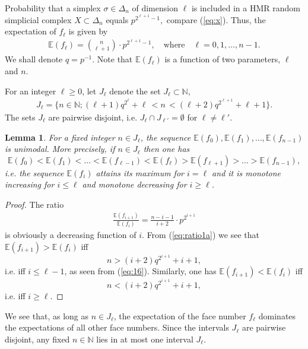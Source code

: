 \documentclass[11pt,twoside, reqno]{amsart}
\theoremstyle{plain}
\newtheorem{lema}{Lemma}
\newtheorem{corollary}[lema]{Corollary}
\theoremstyle{definition}
\newcommand{\N}{\mathbb{N}}
\newcommand{\E}{\mathbb{E}}
\begin{document}
Probability that a simplex $\sigma\in \Delta_n$ of dimension $\ell$ is included in a HMR random simplicial complex $X\subset \Delta_n$ equals 
$
p^{2^{\ell+1}-1},
$
compare (\ref{eq:x}). Thus, the expectation of $f_\ell$ is given by 
\begin{eqnarray}\label{eq:expect}
\mathbb E(f_\ell) =\binom n {\ell+1} \cdot p^{2^{\ell+1}-1}, \quad \mbox{where}\quad \ell=0, 1, \dots, n-1.
\end{eqnarray}
We shall denote $q=p^{-1}.$ Note that $\E(f_\ell)$ is a function of two parameters, $\ell$ and $n$. 

For an integer $\ell\ge 0$, let $J_\ell$ denote the set $J_\ell\subset \N$,
\begin{eqnarray}\label{eq:16}
J_\ell =\{n\in \N; (\ell+1) q^{2^{\ell}}+\ell \, < n\,  <  (\ell+2) q^{2^{\ell+1}}+\ell+1\}.
\end{eqnarray}
The sets $J_\ell$ are pairwise disjoint, i.e. $J_\ell\cap J_{\ell'}=\emptyset$ for $\ell\not=\ell'$. 



\begin{lema}  \label{lm:14a}
For a fixed integer $n\in J_\ell$, the sequence $\E(f_0), \E(f_1), \dots, \E(f_{n-1})$ is unimodal. More precisely, if $n\in J_\ell$ then one has 
$$
\E(f_0)<\E(f_1)< \dots<\E(f_{\ell-1})<\E(f_{\ell})>\E(f_{\ell+1})>\dots >\E(f_{n-1}),
$$
i.e. the sequence $\E(f_i)$ attains its maximum for $i=\ell$ and it is monotone increasing for $i\le \ell$ and monotone decreasing for $i\ge \ell$. 
\end{lema} 
\begin{proof} The ratio
\begin{eqnarray}\label{eq:ratio1a}
 \frac{\mathbb E(f_{i+1})}{\mathbb E(f_{i})}= \frac{n-i-1}{i+2}\cdot p^{2^{i+1}}
\end{eqnarray}
is obviously a decreasing function of $i$. From (\ref{eq:ratio1a}) we see that $\E(f_{i+1})>\E(f_i)$ iff  
$$n>(i+2)q^{2^{i+1}}+i+1,$$ i.e. iff $i\le \ell-1$, as seen from 
(\ref{eq:16}). Similarly, one has $\E(f_{i+1})<\E(f_i)$ iff $$n<(i+2)q^{2^{i+1}}+i+1,$$ i.e. iff $i\ge \ell$. 
\end{proof}
We see that, as long as $n\in J_\ell$, the expectation of the face number $f_{\ell}$ dominates the expectations of all other face numbers. 
Since the intervals $J_\ell$ are pairwise disjoint, any fixed $n\in \N$ lies in at most one interval $J_\ell$. 
\end{document}
